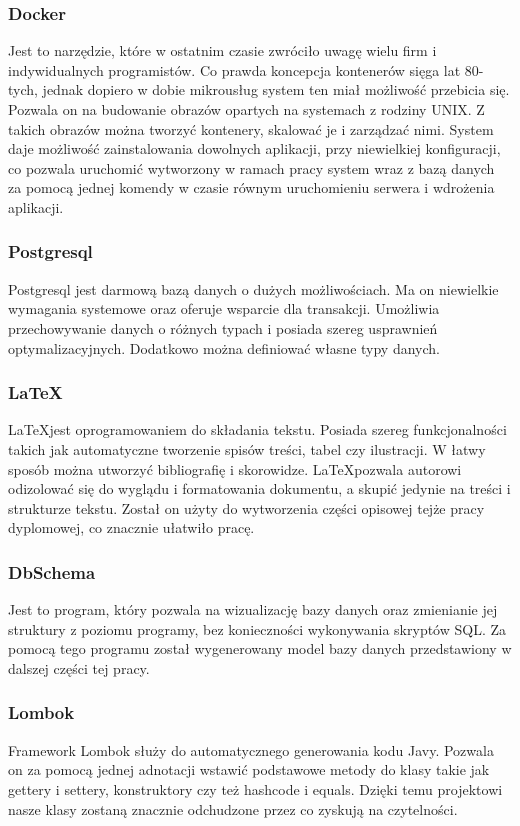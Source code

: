 \subsubsection{Docker}
Jest to narzędzie, które w ostatnim czasie zwróciło uwagę wielu firm i indywidualnych programistów. Co prawda koncepcja kontenerów sięga lat 80-tych, jednak dopiero w dobie mikrousług system ten miał możliwość przebicia się. Pozwala on na budowanie obrazów opartych na systemach z rodziny UNIX. Z takich obrazów można tworzyć kontenery, skalować je i zarządzać nimi. System daje możliwość zainstalowania dowolnych aplikacji, przy niewielkiej konfiguracji, co pozwala uruchomić wytworzony w ramach pracy system wraz z bazą danych za pomocą jednej komendy w czasie równym uruchomieniu serwera i wdrożenia aplikacji.

\subsubsection{Postgresql}
Postgresql jest darmową bazą danych o dużych możliwościach. Ma on niewielkie wymagania systemowe oraz oferuje wsparcie dla transakcji. Umożliwia przechowywanie danych o różnych typach i posiada szereg usprawnień optymalizacyjnych. Dodatkowo można definiować własne typy danych.

\subsubsection{\LaTeX}
\LaTeX jest oprogramowaniem do składania tekstu. Posiada szereg funkcjonalności takich jak automatyczne tworzenie spisów treści, tabel czy ilustracji. W łatwy sposób można utworzyć bibliografię i skorowidze. \LaTeX pozwala autorowi odizolować się do wyglądu i formatowania dokumentu, a skupić jedynie na treści i strukturze tekstu. Został on użyty do wytworzenia części opisowej tejże pracy dyplomowej, co znacznie ułatwiło pracę.

\subsubsection{DbSchema}
Jest to program, który pozwala na wizualizację bazy danych oraz zmienianie jej struktury z poziomu programy, bez konieczności wykonywania skryptów SQL. Za pomocą tego programu został wygenerowany model bazy danych przedstawiony w dalszej części tej pracy.

\subsubsection{Lombok}
Framework Lombok służy do automatycznego generowania kodu Javy. Pozwala on za pomocą jednej adnotacji wstawić podstawowe metody do klasy takie jak gettery i settery, konstruktory czy też hashcode i equals. Dzięki temu projektowi nasze klasy zostaną znacznie odchudzone przez co zyskują na czytelności.
